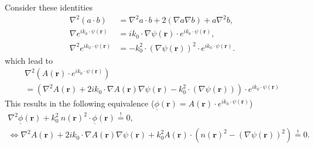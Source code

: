Consider these identities
\begin{align}
    \nabla^2 (a \cdot b) &= \nabla^2 a \cdot b + 2 (\nabla a \nabla b) + a \nabla^2 b, \\
    \nabla e^{i k_0 \cdot \psi(\mathbf{r})} &= i k_0 \cdot \nabla \psi(\mathbf{r}) \cdot e^{i k_0 \cdot \psi(\mathbf{r})}, \\
    \nabla^2 e^{i k_0 \cdot \psi(\mathbf{r})} &= - k_0^2 \cdot {(\nabla \psi(\mathbf{r}))}^2 \cdot e^{i k_0 \cdot \psi(\mathbf{r})}.
\end{align}
which lead to
\begin{gather}
    \nabla^2 (A(\mathbf{r}) \cdot e^{ik_0 \cdot \psi(\mathbf{r})}) \\
    = (\nabla^2 A(\mathbf{r}) + 2ik_0 \cdot \nabla A(\mathbf{r}) \nabla \psi(\mathbf{r}) - k_0^2 \cdot (\nabla \psi(\mathbf{r}))) \cdot e^{ik_0 \cdot \psi(\mathbf{r})}
\end{gather}
This results in the following equivalence (\(\underline{\phi}(\mathbf{r}) = A(\mathbf{r}) \cdot e^{ik_0 \cdot \psi(\mathbf{r})}\))
\begin{gather}
    \nabla^2 \underline{\phi}(\mathbf{r}) + k_0^2\ n{(\mathbf{r})}^2 \cdot \underline{\phi}(\mathbf{r}) \stackrel{!}{=} 0, \\
    \Leftrightarrow \nabla^2 A(\mathbf{r}) + 2ik_0 \cdot \nabla A(\mathbf{r}) \nabla \psi(\mathbf{r}) + k_0^2 A(\mathbf{r}) \cdot ({n(\mathbf{r})}^2 - {(\nabla \psi(\mathbf{r}))}^2) \stackrel{!}{=} 0.
\end{gather}
